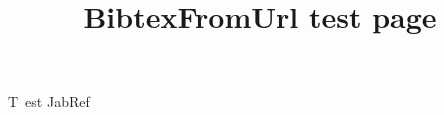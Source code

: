 \documentclass[12pt,a4paper]{article}
\begin{document}
\title{BibtexFromUrl test page}

\maketitle

T~\cite{html-50:online}est\cite{test1} \cite{test2} \cite{select} JabRef~\cite{JabRe89:online}


\raggedright

\end{document}
